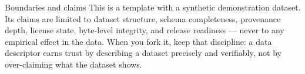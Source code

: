 \documentclass[
  ignorenonframetext,
]{beamer}
\begin{document}
\begin{frame}[allowframebreaks]{Boundaries and claims}
\protect{}\label{boundaries-and-claims}
This is a template with a synthetic demonstration dataset. Its claims
are limited to dataset structure, schema completeness, provenance depth,
license state, byte-level integrity, and release readiness --- never to
any empirical effect in the data. When you fork it, keep that
discipline: a data descriptor earns trust by describing a dataset
precisely and verifiably, not by over-claiming what the dataset shows.
\end{frame}
\end{document}
